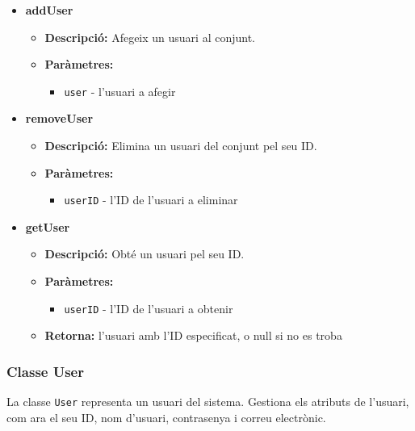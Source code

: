 \documentclass[a4paper, t]{article}
\begin{document}
\begin{itemize}
    \item \textbf{addUser}
    \begin{itemize}
        \item \textbf{Descripció:} Afegeix un usuari al conjunt.
        \item \textbf{Paràmetres:}
        \begin{itemize}
            \item \texttt{user} - l'usuari a afegir
        \end{itemize}
    \end{itemize}

    \item \textbf{removeUser}
    \begin{itemize}
        \item \textbf{Descripció:} Elimina un usuari del conjunt pel seu ID.
        \item \textbf{Paràmetres:}
        \begin{itemize}
            \item \texttt{userID} - l'ID de l'usuari a eliminar
        \end{itemize}
    \end{itemize}

    \item \textbf{getUser}
    \begin{itemize}
        \item \textbf{Descripció:} Obté un usuari pel seu ID.
        \item \textbf{Paràmetres:}
        \begin{itemize}
            \item \texttt{userID} - l'ID de l'usuari a obtenir
        \end{itemize}
        \item \textbf{Retorna:} l'usuari amb l'ID especificat, o null si no es troba
    \end{itemize}
\end{itemize}

\subsubsection{Classe User}
La classe \texttt{User} representa un usuari del sistema. Gestiona els atributs de l'usuari, com ara el seu ID, nom d'usuari, contrasenya i correu electrònic.
\end{document}
